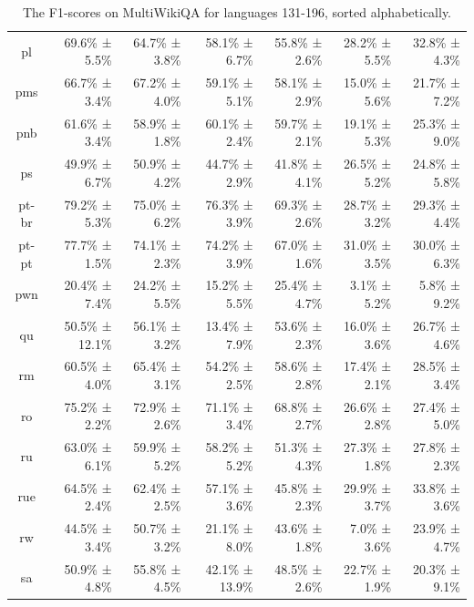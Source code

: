\documentclass[10pt, a4paper]{article}
\begin{document}
\begin{table}[h]
\begin{tabular}{crrrrrr}
pl & 69.6\% ± 5.5\% & 64.7\% ± 3.8\% & 58.1\% ± 6.7\% & 55.8\% ± 2.6\% & 28.2\% ± 5.5\% & 32.8\% ± 4.3\% \\
pms & 66.7\% ± 3.4\% & 67.2\% ± 4.0\% & 59.1\% ± 5.1\% & 58.1\% ± 2.9\% & 15.0\% ± 5.6\% & 21.7\% ± 7.2\% \\
pnb & 61.6\% ± 3.4\% & 58.9\% ± 1.8\% & 60.1\% ± 2.4\% & 59.7\% ± 2.1\% & 19.1\% ± 5.3\% & 25.3\% ± 9.0\% \\
ps & 49.9\% ± 6.7\% & 50.9\% ± 4.2\% & 44.7\% ± 2.9\% & 41.8\% ± 4.1\% & 26.5\% ± 5.2\% & 24.8\% ± 5.8\% \\
pt-br & 79.2\% ± 5.3\% & 75.0\% ± 6.2\% & 76.3\% ± 3.9\% & 69.3\% ± 2.6\% & 28.7\% ± 3.2\% & 29.3\% ± 4.4\% \\
pt-pt & 77.7\% ± 1.5\% & 74.1\% ± 2.3\% & 74.2\% ± 3.9\% & 67.0\% ± 1.6\% & 31.0\% ± 3.5\% & 30.0\% ± 6.3\% \\
pwn & 20.4\% ± 7.4\% & 24.2\% ± 5.5\% & 15.2\% ± 5.5\% & 25.4\% ± 4.7\% & 3.1\% ± 5.2\% & 5.8\% ± 9.2\% \\
qu & 50.5\% ± 12.1\% & 56.1\% ± 3.2\% & 13.4\% ± 7.9\% & 53.6\% ± 2.3\% & 16.0\% ± 3.6\% & 26.7\% ± 4.6\% \\
rm & 60.5\% ± 4.0\% & 65.4\% ± 3.1\% & 54.2\% ± 2.5\% & 58.6\% ± 2.8\% & 17.4\% ± 2.1\% & 28.5\% ± 3.4\% \\
ro & 75.2\% ± 2.2\% & 72.9\% ± 2.6\% & 71.1\% ± 3.4\% & 68.8\% ± 2.7\% & 26.6\% ± 2.8\% & 27.4\% ± 5.0\% \\
ru & 63.0\% ± 6.1\% & 59.9\% ± 5.2\% & 58.2\% ± 5.2\% & 51.3\% ± 4.3\% & 27.3\% ± 1.8\% & 27.8\% ± 2.3\% \\
rue & 64.5\% ± 2.4\% & 62.4\% ± 2.5\% & 57.1\% ± 3.6\% & 45.8\% ± 2.3\% & 29.9\% ± 3.7\% & 33.8\% ± 3.6\% \\
rw & 44.5\% ± 3.4\% & 50.7\% ± 3.2\% & 21.1\% ± 8.0\% & 43.6\% ± 1.8\% & 7.0\% ± 3.6\% & 23.9\% ± 4.7\% \\
sa & 50.9\% ± 4.8\% & 55.8\% ± 4.5\% & 42.1\% ± 13.9\% & 48.5\% ± 2.6\% & 22.7\% ± 1.9\% & 20.3\% ± 9.1\% \\
\hline
\end{tabular}
\caption{The F1-scores on MultiWikiQA for languages 131-196, sorted alphabetically.}
\label{tab:num-samples-in-small-subsets}
\end{table}
\end{document}
